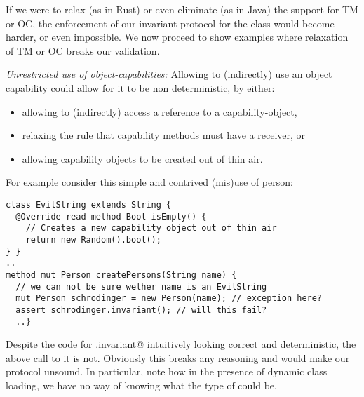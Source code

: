 
\noindent If we were to relax (as in Rust) or even eliminate (as in Java) the support for TM or OC, the enforcement of our invariant protocol for the \Q@Person@ class would become harder, or even impossible. We now proceed to show examples where
relaxation of TM or OC breaks our validation. 

\loseSpace
\noindent\textit{Unrestricted use of object-capabilities:}
Allowing \validate{} to (indirectly) use an object capability could allow for it to be non deterministic, by either:
\begin{itemize}
\item allowing \validate{} to (indirectly) access a \Q@mut@ reference to a capability-object,
\item relaxing the rule that capability methods must have a \Q@mut@ receiver, or
\item allowing capability objects to be created out of thin air.
\end{itemize}

\noindent For example consider this simple and contrived (mis)use of person:
\begin{lstlisting}[morekeywords={assert}]
class EvilString extends String {
  @Override read method Bool isEmpty() {
    // Creates a new capability object out of thin air
    return new Random().bool();
} }
..
method mut Person createPersons(String name) {
  // we can not be sure wether name is an EvilString
  mut Person schrodinger = new Person(name); // exception here?
  assert schrodinger.invariant(); // will this fail?
  ..}
\end{lstlisting}
Despite the code for \Q@Person.invariant@ intuitively looking correct and deterministic, the above call to it is not. Obviously this breaks any reasoning and would make our protocol unsound. 
In particular, note how in the presence of dynamic class loading, we have no way of knowing what the type of \Q@name@ could be.

